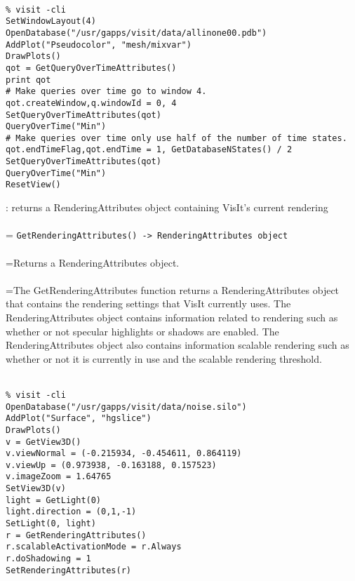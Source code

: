 \documentclass[10pt,a4paper]{report}
\begin{document}
\\[-6mm]
\begin{verbatim}% visit -cli
SetWindowLayout(4)
OpenDatabase("/usr/gapps/visit/data/allinone00.pdb")
AddPlot("Pseudocolor", "mesh/mixvar")
DrawPlots()
qot = GetQueryOverTimeAttributes()
print qot
# Make queries over time go to window 4.
qot.createWindow,q.windowId = 0, 4
SetQueryOverTimeAttributes(qot)
QueryOverTime("Min")
# Make queries over time only use half of the number of time states.
qot.endTimeFlag,qot.endTime = 1, GetDatabaseNStates() / 2
SetQueryOverTimeAttributes(qot)
QueryOverTime("Min")
ResetView()
\end{verbatim}
\newpage


{}
: returns a RenderingAttributes object containing VisIt's current rendering\\[-3mm]

 \\ 
\hangindent=\parindent 
\verb!GetRenderingAttributes() -> RenderingAttributes object!\\ [-3mm]

 \\ 
\hangindent=\parindent Returns a RenderingAttributes object. \\[-3mm] 

 \\ 
\hangindent=\parindent The GetRenderingAttributes function returns a RenderingAttributes object that contains the rendering settings that VisIt currently uses. The RenderingAttributes object contains information related to rendering such as whether or not specular highlights or shadows are enabled. The RenderingAttributes object also contains information scalable rendering such as whether or not it is currently in use and the scalable rendering threshold. \\[-3mm] 

\\[-6mm]
\begin{verbatim}% visit -cli
OpenDatabase("/usr/gapps/visit/data/noise.silo")
AddPlot("Surface", "hgslice")
DrawPlots()
v = GetView3D()
v.viewNormal = (-0.215934, -0.454611, 0.864119)
v.viewUp = (0.973938, -0.163188, 0.157523)
v.imageZoom = 1.64765
SetView3D(v)
light = GetLight(0)
light.direction = (0,1,-1)
SetLight(0, light)
r = GetRenderingAttributes()
r.scalableActivationMode = r.Always
r.doShadowing = 1
SetRenderingAttributes(r)
\end{verbatim}
\newpage
\end{document}
